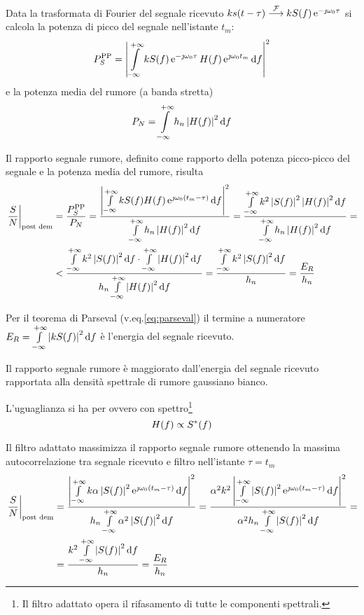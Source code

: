 Data la trasformata di Fourier del segnale ricevuto $k s(t-\tau) \stackrel{\operatorname{\mathcal{F}}}{\longrightarrow} k S(f) \operatorname{e}^{-\jmath\omega_0\tau}$ si calcola la potenza di picco del segnale nell'istante $t_m$:
\begin{equation}
P_S^\text{PP}=\left|{\int\limits_{-\infty}^{+\infty}{k S(f)\operatorname{e}^{-\jmath\omega_0 \tau} H(f)\operatorname{e}^{\jmath\omega_0 t_m}}{\,\mathop{}\!\mathrm{d}{f}}}\right|^2
\end{equation}
e la potenza media del rumore (a banda stretta)
\begin{equation}
P_N=\int\limits_{-\infty}^{+\infty}{h_n\left|{H(f)}\right|^2}{\,\mathop{}\!\mathrm{d}{f}}
\end{equation}

Il rapporto segnale rumore, definito come rapporto della potenza picco-picco del segnale e la potenza media del rumore, risulta
\begin{equation}\begin{split}
\restrict{\frac{S}{N}}{\text{post dem}}&=\frac{P_S^\text{PP}}{P_N}=\frac{\abs{\intinf{k S(f) H(f)\e{\jmath\omega_0 (t_m-\tau)}}{f}}^2}{\intinf{h_n\abs{H(f)}^2}{f}}=
\frac{\intinf{k^2\abs{S(f)}^2\abs{H(f)}^2}{f}}{\intinf{h_n\abs{H(f)}^2}{f}}=\\
&<\frac{\intinf{k^2\abs{S(f)}^2}{f}\cdot\intinf{\abs{H(f)}^2}{f}}{h_n\intinf{\abs{H(f)}^2}{f}}=\frac{\intinf{k^2\abs{S(f)}^2}{f}}{h_n}=\frac{E_R}{h_n}
\end{split}\end{equation} 

Per il teorema di Parseval (v.eq.\ref{eq:parseval}) il termine a numeratore $E_R=\int\limits_{-\infty}^{+\infty}{\left|{k S(f)}\right|^2}{\,\mathop{}\!\mathrm{d}{f}}$ è l'energia del segnale ricevuto.

Il rapporto segnale rumore è maggiorato dall'energia del segnale ricevuto rapportata alla densità spettrale di rumore gaussiano bianco.

L'uguaglianza si ha per  ovvero con spettro\footnote{Il filtro adattato opera il rifasamento di tutte le componenti spettrali.} \begin{equation}H(f)\propto{S}^\ast(f)\label{eq:radar_filtro_adattato_rumore_bianco}\end{equation}

Il filtro adattato massimizza il rapporto segnale rumore ottenendo la massima autocorrelazione tra segnale ricevuto e filtro nell'istante $\tau=t_m$
\begin{equation}\begin{split}
\left.{\frac{S}{N}}\right\rvert_{\text{post dem}}&=\dfrac{\left|{\int\limits_{-\infty}^{+\infty}{k\alpha\left|{S(f)}\right|^2\operatorname{e}^{\jmath\omega_0(t_m-\tau)}}{\,\mathop{}\!\mathrm{d}{f}}}\right|^2}{h_n\int\limits_{-\infty}^{+\infty}{\alpha^2\left|{S(f)}\right|^2}{\,\mathop{}\!\mathrm{d}{f}}}=\dfrac{\alpha^2 k^2\left|{\int\limits_{-\infty}^{+\infty}{\left|{S(f)}\right|^2\operatorname{e}^{\jmath\omega_0(t_m-\tau)}}{\,\mathop{}\!\mathrm{d}{f}}}\right|^2}{\alpha^2 h_n\int\limits_{-\infty}^{+\infty}{\left|{S(f)}\right|^2}{\,\mathop{}\!\mathrm{d}{f}}}=\\
&=\frac{k^2\int\limits_{-\infty}^{+\infty}{\left|{S(f)}\right|^2}{\,\mathop{}\!\mathrm{d}{f}}}{h_n}=\frac{E_R}{h_n}
\end{split}\end{equation}

